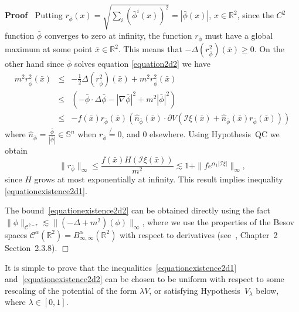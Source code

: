 \documentclass[a4paper,10pt]{article}
\newenvironment{proof}{\noindent\textbf{Proof\ }}{\hspace*{\fill}$\Box$\medskip}
\begin{document}
\begin{proof}
  Putting $r_{\bar{\phi}} (x) = \sqrt{\sum_i (\bar{\phi}^i (x))^2} = |
  \bar{\phi} (x) |$, $x \in \mathbb{R}^2$, since the $C^2$ function
  $\bar{\phi}$ converges to zero at infinity, the function $r_{\bar{\phi}}$
  must have a global maximum at some point $\bar{x} \in \mathbb{R}^2$. This
  means that $- \Delta (r^2_{\bar{\phi}}) (\bar{x}) \geqslant 0$. On the other
  hand since $\bar{\phi}$ solves equation {\eqref{equation2d2}} we have
  \begin{eqnarray}
    m^2 r^2_{\bar{\phi}} (\bar{x}) & \leqslant & - \frac{1}{2} \Delta
    (r^2_{\bar{\phi}}) (\bar{x}) + m^2 r^2_{\bar{\phi}} (\bar{x}) \nonumber\\
    & \leqslant & (- \bar{\phi} \cdot \Delta \bar{\phi} - | \nabla \bar{\phi}
    |^2 + m^2 | \bar{\phi} |^2) \nonumber\\
    & \leqslant & - f (\bar{x}) r_{\bar{\phi}} (\bar{x})
    (\hat{n}_{\bar{\phi}} (\bar{x}) \cdot \partial V (\mathcal{I} \xi
    (\bar{x}) + \hat{n}_{\bar{\phi}} (\bar{x}) r_{\bar{\phi}} (\bar{x})))
    \nonumber
  \end{eqnarray}
  where $\hat{n}_{\bar{\phi}} = \frac{\bar{\phi}}{| \bar{\phi} |} \in
  \mathbb{S}^n$ when $r_{\bar{\phi}} \not{=} 0$, and $0$ elsewhere. Using
  Hypothesis~QC we obtain
  \[ \| r_{\bar{\phi}} \|_{\infty} \leqslant \frac{f (\bar{x}) H (\mathcal{I}
     \xi (\bar{x}))}{m^2} \lesssim 1 +\|f e^{\alpha_1 | \mathcal{I} \xi |}
     \|_{\infty}, \]
  since $H$ grows at most exponentially at infinity. This result implies
  inequality {\eqref{equationexistence2d1}}.
  
  The bound~{\eqref{equationexistence2d2}} can be obtained directly using the
  fact $\| \phi \|_{\mathcal{C}^{2 - \tau}} \lesssim \| (- \Delta + m^2)
  (\phi) \|_{\infty}$, where we use the properties of the Besov spaces
  $\mathcal{C}^{\alpha} (\mathbb{R}^2) = B^{\alpha}_{\infty, \infty}
  (\mathbb{R}^2)$ with respect to derivatives (see~{\cite{Trie1983}},
  Chapter~2 Section~2.3.8).
\end{proof}

\begin{remark}
  \label{remark_bound}It is simple to prove that the
  inequalities~{\eqref{equationexistence2d1}}
  and~{\eqref{equationexistence2d2}} can be chosen to be uniform with respect
  to some rescaling of the potential of the form $\lambda V$, or satisfying
  Hypothesis~$V_{\lambda}$ below, where $\lambda \in [0, 1]$.
\end{remark}
\end{document}
